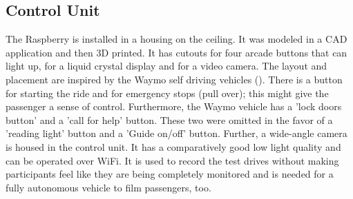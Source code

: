 \subsection{Control Unit}
\label{ssec:controlunit}
The Raspberry is installed in a housing on the ceiling. It was modeled in a CAD application and then 3D printed. It has cutouts for four arcade buttons that can light up, for a liquid crystal display and for a video camera. The layout and placement are inspired by the Waymo self driving vehicles (\emph{}). There is a button for starting the ride and for emergency stops (pull over); this might give the passenger a sense of control. Furthermore, the Waymo vehicle has a 'lock doors button' and a 'call for help' button. These two were omitted in the favor of a 'reading light' button and a 'Guide on/off' button. Further, a wide-angle camera is housed in the control unit. It has a comparatively good low light quality and can be operated over WiFi. It is used to record the test drives without making participants feel like they are being completely monitored and is needed for a fully autonomous vehicle to film passengers, too. 

